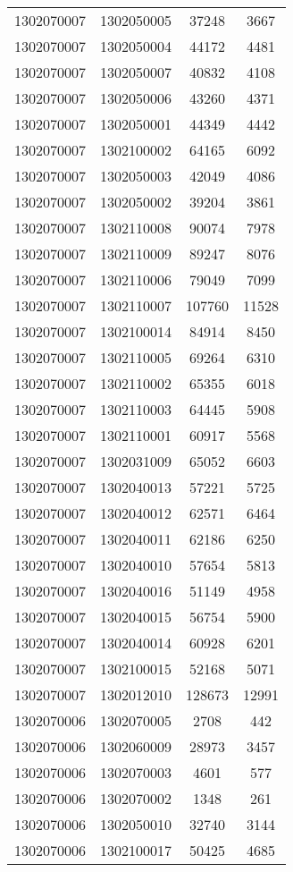 \begin{longtable}{llcc}
1302070007 & 1302050005 & 37248 & 3667\\
1302070007 & 1302050004 & 44172 & 4481\\
1302070007 & 1302050007 & 40832 & 4108\\
1302070007 & 1302050006 & 43260 & 4371\\
1302070007 & 1302050001 & 44349 & 4442\\
1302070007 & 1302100002 & 64165 & 6092\\
1302070007 & 1302050003 & 42049 & 4086\\
1302070007 & 1302050002 & 39204 & 3861\\
1302070007 & 1302110008 & 90074 & 7978\\
1302070007 & 1302110009 & 89247 & 8076\\
1302070007 & 1302110006 & 79049 & 7099\\
1302070007 & 1302110007 & 107760 & 11528\\
1302070007 & 1302100014 & 84914 & 8450\\
1302070007 & 1302110005 & 69264 & 6310\\
1302070007 & 1302110002 & 65355 & 6018\\
1302070007 & 1302110003 & 64445 & 5908\\
1302070007 & 1302110001 & 60917 & 5568\\
1302070007 & 1302031009 & 65052 & 6603\\
1302070007 & 1302040013 & 57221 & 5725\\
1302070007 & 1302040012 & 62571 & 6464\\
1302070007 & 1302040011 & 62186 & 6250\\
1302070007 & 1302040010 & 57654 & 5813\\
1302070007 & 1302040016 & 51149 & 4958\\
1302070007 & 1302040015 & 56754 & 5900\\
1302070007 & 1302040014 & 60928 & 6201\\
1302070007 & 1302100015 & 52168 & 5071\\
1302070007 & 1302012010 & 128673 & 12991\\
1302070006 & 1302070005 & 2708 & 442\\
1302070006 & 1302060009 & 28973 & 3457\\
1302070006 & 1302070003 & 4601 & 577\\
1302070006 & 1302070002 & 1348 & 261\\
1302070006 & 1302050010 & 32740 & 3144\\
1302070006 & 1302100017 & 50425 & 4685\\

\end{longtable}
